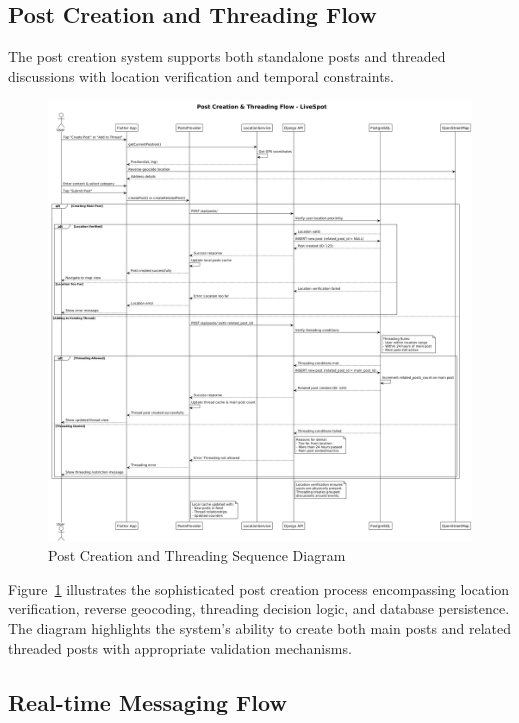 \subsection{Post Creation and Threading Flow}

The post creation system supports both standalone posts and threaded discussions with location verification and temporal constraints.

\begin{figure}[h!]
    \centering
    \includegraphics[width=\textwidth,height=0.75\textheight,keepaspectratio]{figures/post_creation_sequence}
    \caption{Post Creation and Threading Sequence Diagram}
    \label{fig:post_creation_sequence}
\end{figure}

Figure~\ref{fig:post_creation_sequence} illustrates the sophisticated post creation process encompassing location verification, reverse geocoding, threading decision logic, and database persistence. The diagram highlights the system's ability to create both main posts and related threaded posts with appropriate validation mechanisms.
\clearpage
\subsection{Real-time Messaging Flow}

